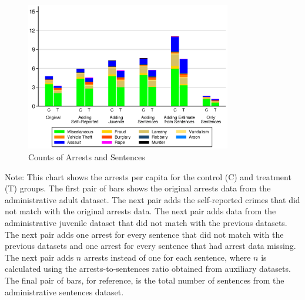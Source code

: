 \documentclass[static]{JJH-Beamer}
\begin{document}
\begin{frame}

\begin{figure}[H]
\caption{Counts of Arrests and Sentences}\label{fig:datagraph}
\begin{center}
\includegraphics[width=0.8\textwidth]{AppOutput/Crime/counts_misc}
\end{center}
\end{figure}

\end{frame}

{\flushleft \normalsize Note: This chart shows the arrests per capita for the control (C) and treatment (T) groups. The first pair of bars shows the original arrests data from the administrative adult dataset. The next pair adds the self-reported crimes that did not match with the original arrests data. The next pair adds data from the administrative juvenile dataset that did not match with the previous datasets. The next pair adds one arrest for every sentence that did not match with the previous datasets and one arrest for every sentence that had arrest data missing. The next pair adds $n$ arrests instead of one for each sentence, where $n$ is calculated using the arrests-to-sentences ratio obtained from auxiliary datasets. The final pair of bars, for reference, is the total number of sentences from the administrative sentences dataset.\\}
\end{document}
